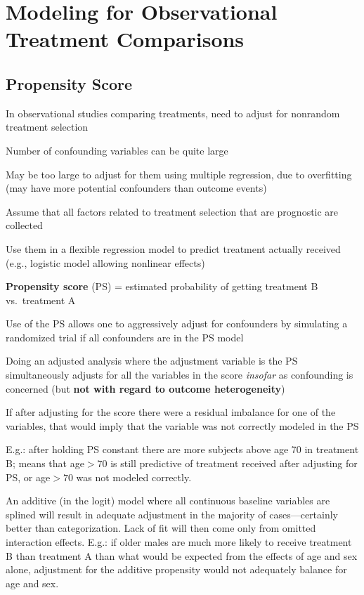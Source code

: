 \chapter{Modeling for Observational Treatment Comparisons}
\section{Propensity Score}\label{sec:propens}
\bi
\item In observational studies comparing treatments, need to adjust
  for nonrandom treatment selection
\item Number of confounding variables can be quite large
\item May be too large to adjust for them using multiple regression,
  due to overfitting (may have more potential confounders than 
  outcome events)
\item Assume that all factors related to treatment selection that are
  prognostic are collected
\item Use them in a flexible regression model to predict treatment
  actually received (e.g., logistic model allowing nonlinear effects)
\item \textbf{Propensity score} (PS) = estimated probability of getting
  treatment B vs.\ treatment A
\item Use of the PS allows one to aggressively
  adjust for confounders by simulating a randomized trial if all
  confounders are in the PS model
\item Doing an adjusted analysis where the adjustment variable is the
  PS simultaneously adjusts for all the variables in the
  score \emph{insofar} as confounding is concerned (but \textbf{not
    with regard to outcome heterogeneity})
\item If after adjusting for the score there were a residual imbalance
  for one of the variables, that would imply that the variable was
  not correctly modeled in the PS
\item E.g.: after holding PS constant there are more subjects above
  age 70 in treatment B; means that age$>70$ is still predictive of
  treatment received after adjusting for PS, or age$>70$ was not
  modeled correctly.
\item An additive (in the logit) model where all continuous baseline
  variables are splined will result in adequate adjustment in the
  majority of cases---certainly better than categorization.  Lack of
  fit will then come only from omitted interaction effects.  E.g.: if
  older males are much more likely to receive treatment B than
  treatment A than what would be expected from the effects of age and
  sex alone, adjustment for the additive propensity would not
  adequately balance for age and sex. 
\ei


